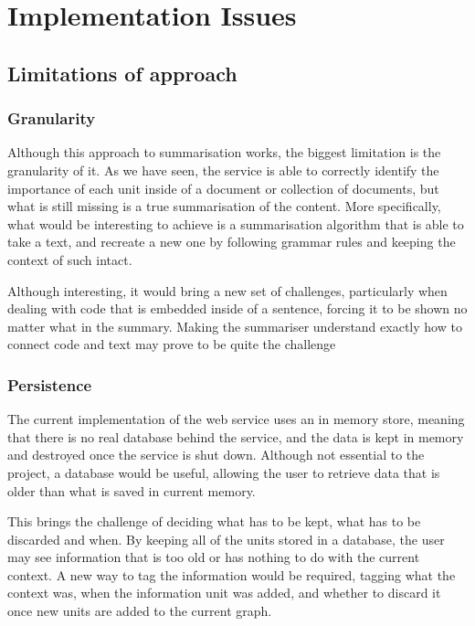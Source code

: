 \section{Implementation Issues}\label{sec:implementationIssues}

\subsection{Limitations of approach}
\subsubsection{Granularity}
Although this approach to summarisation works, the biggest limitation is the granularity of it. As we have seen, the service is able to correctly identify the importance of each unit inside of a document or collection of documents, but what is still missing is a true summarisation of the content. More specifically, what would be interesting to achieve is a summarisation algorithm that is able to take a text, and recreate a new one by following grammar rules and keeping the context of such intact.

Although interesting, it would bring a new set of challenges, particularly when dealing with code that is embedded inside of a sentence, forcing it to be shown no matter what in the summary. Making the summariser understand exactly how to connect code and text may prove to be quite the challenge

\subsubsection{Persistence}
The current implementation of the web service uses an in memory store, meaning that there is no real database behind the service, and the data is kept in memory and destroyed once the service is shut down. Although not essential to the project, a database would be useful, allowing the user to retrieve data that is older than what is saved in current memory. 

This brings the challenge of deciding what has to be kept, what has to be discarded and when. By keeping all of the units stored in a database, the user may see information that is too old or has nothing to do with the current context. A new way to tag the information would be required, tagging what the context was, when the information unit was added, and whether to discard it once new units are added to the current graph.

